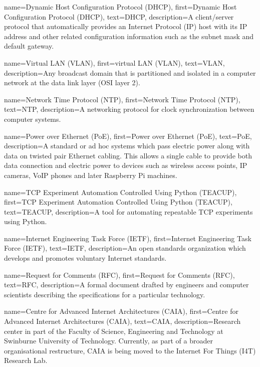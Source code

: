 {
    name={Dynamic Host Configuration Protocol (DHCP)},
    first={Dynamic Host Configuration Protocol (DHCP)},
    text={DHCP},
    description={A client/server protocol that automatically provides an Internet Protocol (IP) host with its IP address and other related configuration information such as the subnet mask and default gateway.}
}

{
    name={Virtual LAN (VLAN)},
    first={virtual LAN (VLAN)},
    text={VLAN},
    description={Any broadcast domain that is partitioned and isolated in a computer network at the data link layer (OSI layer 2).}
}

{
    name={Network Time Protocol (NTP)},
    first={Network Time Protocol (NTP)},
    text={NTP},
    description={A networking protocol for clock synchronization between computer systems.}
}

{
    name={Power over Ethernet (PoE)},
    first={Power over Ethernet (PoE)},
    text={PoE},
    description={A standard or ad hoc systems which pass electric power along with data on twisted pair Ethernet cabling. This allows a single cable to provide both data connection and electric power to devices such as wireless access points, IP cameras, VoIP phones and later Raspberry Pi machines.}
}

{
    name={TCP Experiment Automation Controlled Using Python (TEACUP)},
    first={TCP Experiment Automation Controlled Using Python (TEACUP)},
    text={TEACUP},
    description={A tool for automating repeatable TCP experiments using Python.}
}

{
    name={Internet Engineering Task Force (IETF)},
    first={Internet Engineering Task Force (IETF)},
    text={IETF},
    description={An open standards organization which develops and promotes voluntary Internet standards.}
}

{
    name={Request for Comments (RFC)},
    first={Request for Comments (RFC)},
    text={RFC},
    description={A formal document drafted by engineers and computer scientists describing the specifications for a particular technology.}
}

{
    name={Centre for Advanced Internet Architectures (CAIA)},
    first={Centre for Advanced Internet Architectures (CAIA)},
    text={CAIA},
    description={Research center in part of the Faculty of Science, Engineering and Technology at Swinburne University of Technology. Currently, as part of a broader organisational restructure, CAIA is being moved to the Internet For Things (I4T) Research Lab.}
}